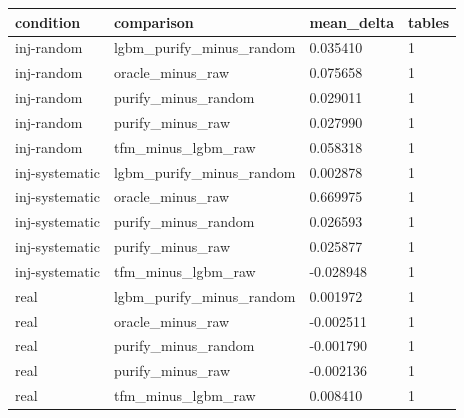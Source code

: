 \begin{tabular}{llll}
\hline
condition & comparison & mean\_delta & tables \\
\hline
inj-random & lgbm\_purify\_minus\_random & 0.035410 & 1 \\
inj-random & oracle\_minus\_raw & 0.075658 & 1 \\
inj-random & purify\_minus\_random & 0.029011 & 1 \\
inj-random & purify\_minus\_raw & 0.027990 & 1 \\
inj-random & tfm\_minus\_lgbm\_raw & 0.058318 & 1 \\
inj-systematic & lgbm\_purify\_minus\_random & 0.002878 & 1 \\
inj-systematic & oracle\_minus\_raw & 0.669975 & 1 \\
inj-systematic & purify\_minus\_random & 0.026593 & 1 \\
inj-systematic & purify\_minus\_raw & 0.025877 & 1 \\
inj-systematic & tfm\_minus\_lgbm\_raw & -0.028948 & 1 \\
real & lgbm\_purify\_minus\_random & 0.001972 & 1 \\
real & oracle\_minus\_raw & -0.002511 & 1 \\
real & purify\_minus\_random & -0.001790 & 1 \\
real & purify\_minus\_raw & -0.002136 & 1 \\
real & tfm\_minus\_lgbm\_raw & 0.008410 & 1 \\
\hline
\end{tabular}
